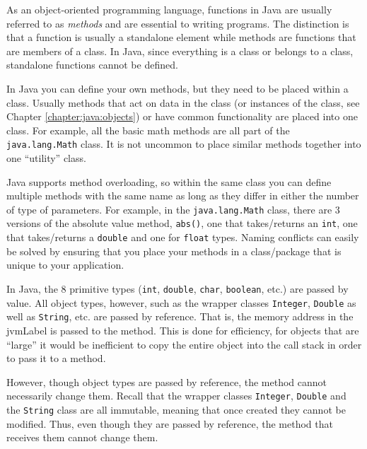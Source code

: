 

As an object-oriented programming language, functions in
Java are usually referred to as \emph{methods} and are 
essential to writing programs.  The distinction is that a 
function is usually a standalone element while methods
are functions that are members of a class.  In Java, since
everything is a class or belongs to a class, standalone
functions cannot be defined.

In Java you can define your own methods, but they
need to be placed within a class.  Usually methods that
act on data in the class (or instances of the class, see
Chapter \ref{chapter:java:objects}) or have common
functionality are placed into one class.  For example, all
the basic math methods are all part of the 
\texttt{java.lang.Math} class.  It is not uncommon
to place similar methods together into one ``utility'' class.

Java supports method overloading, so within the same 
class you can define multiple methods with the same name
as long as they differ in either the number of type of 
parameters.  For example, in the \texttt{java.lang.Math}
class, there are 3 versions of the absolute value method,
\texttt{abs()}, one that takes/returns an 
\texttt{int}, one that takes/returns a \texttt{double}
and one for \texttt{float} types.  Naming conflicts
can easily be solved by ensuring that you place your 
methods in a class/package that is unique to your application.

In Java, the 8 primitive types (\texttt{int}, \texttt{double},
\texttt{char}, \texttt{boolean}, etc.) are 
passed by value.  All object types, however, such as the 
wrapper classes \texttt{Integer}, \texttt{Double}
as well as \texttt{String}, etc. are passed by 
reference.  That is, the memory address in the \gls{jvmLabel}
is passed to the method.  This is done for efficiency, for 
objects that are ``large'' it would be inefficient to copy the
entire object into the call stack in order to pass it to a
method.  

However, though object types are passed by reference, the
method cannot necessarily change them.  Recall that the wrapper
classes \texttt{Integer}, \texttt{Double} and
the \texttt{String} class are all \gls{immutable}, meaning
that once created they cannot be modified.  Thus, even though
they are passed by reference, the method that receives them
cannot change them.

